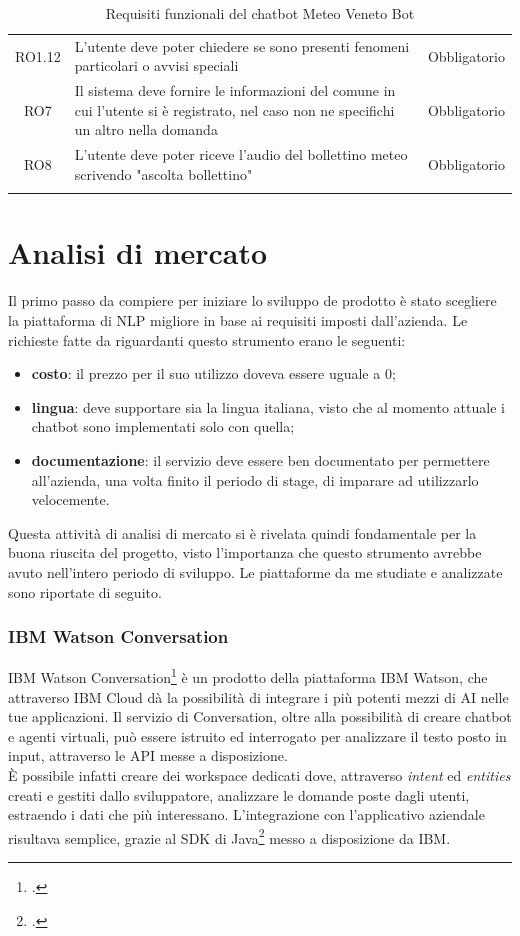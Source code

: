 \begin{longtable}{|c|>{\centering}m{7cm}|c|}
RO1.12 & L'utente deve poter chiedere se sono presenti fenomeni particolari o avvisi speciali & Obbligatorio\\ 
RO7 & Il sistema deve fornire le informazioni del comune in cui l'utente si è registrato, nel caso non ne specifichi un altro nella domanda & Obbligatorio\\
RO8 & L'utente deve poter riceve l'audio del bollettino meteo scrivendo "ascolta bollettino" & Obbligatorio\\ 
\hline
\caption{Requisiti funzionali del chatbot Meteo Veneto Bot}
\end{longtable}

\section{Analisi di mercato}
Il primo passo da compiere per iniziare lo sviluppo de prodotto è stato scegliere la piattaforma di \gls{NLP} migliore in base ai requisiti imposti dall'azienda. Le richieste fatte da \azienda{} riguardanti questo strumento erano le seguenti:
\begin{itemize}
	\item \textbf{costo}: il prezzo per il suo utilizzo doveva essere uguale a 0;
	\item \textbf{lingua}: deve supportare sia la lingua italiana, visto che al momento attuale i \gls{chatbot} sono implementati solo con quella;
	\item \textbf{documentazione}: il servizio deve essere ben documentato per permettere all'azienda, una volta finito il periodo di stage, di imparare ad utilizzarlo velocemente.
\end{itemize}

Questa attività di analisi di mercato si è rivelata quindi fondamentale per la buona riuscita del progetto, visto l'importanza che questo strumento avrebbe avuto nell'intero periodo di sviluppo. Le piattaforme da me studiate e analizzate sono riportate di seguito.

\subsubsection{IBM Watson Conversation}
IBM Watson Conversation\footcite{watson} è un prodotto della piattaforma IBM Watson, che attraverso IBM Cloud dà la possibilità di integrare i più potenti mezzi di AI nelle tue applicazioni. Il servizio di Conversation, oltre alla possibilità di creare \gls{chatbot} e agenti virtuali, può essere istruito ed interrogato per analizzare il testo posto in input, attraverso le \gls{API} messe a disposizione.\\
È possibile infatti creare dei workspace dedicati dove, attraverso \emph{intent} ed \emph{entities} creati e gestiti dallo sviluppatore, analizzare le domande poste dagli utenti, estraendo i dati che più interessano. L'integrazione con l'applicativo aziendale risultava semplice, grazie al SDK di Java\footcite{watsonSDK} messo a disposizione da IBM.

